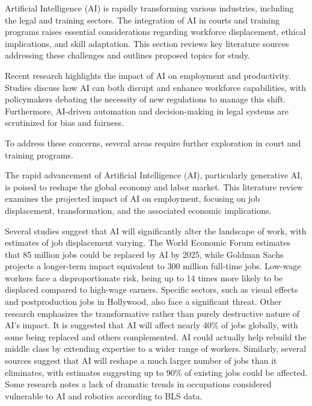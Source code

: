 \documentclass[a4paper,headinclude=on,footinclude=on,12pt,oneside]{scrbook}
\begin{document}
Artificial Intelligence (AI) is rapidly transforming various industries, including the legal and training sectors. The integration of AI in courts and training programs raises essential considerations regarding workforce displacement, ethical implications, and skill adaptation. This section reviews key literature sources addressing these challenges and outlines proposed topics for study.

Recent research highlights the impact of AI on employment and productivity. Studies discuss how AI can both disrupt and enhance workforce capabilities, with policymakers debating the necessity of new regulations to manage this shift. Furthermore, AI-driven automation and decision-making in legal systems are scrutinized for bias and fairness.

To address these concerns, several areas require further exploration in court and training programs.


The rapid advancement of Artificial Intelligence (AI), particularly generative AI, is poised to reshape the global economy and labor market. This literature review examines the projected impact of AI on employment, focusing on job displacement, transformation, and the associated economic implications.


Several studies suggest that AI will significantly alter the landscape of work, with estimates of job displacement varying. The World Economic Forum estimates that 85 million jobs could be replaced by AI by 2025, while Goldman Sachs projects a longer-term impact equivalent to 300 million full-time jobs. Low-wage workers face a disproportionate risk, being up to 14 times more likely to be displaced compared to high-wage earners. Specific sectors, such as visual effects and postproduction jobs in Hollywood, also face a significant threat. Other research emphasizes the transformative rather than purely destructive nature of AI’s impact. It is suggested that AI will affect nearly 40\% of jobs globally, with some being replaced and others complemented. AI could actually help rebuild the middle class by extending expertise to a wider range of workers. Similarly, several sources suggest that AI will reshape a much larger number of jobs than it eliminates, with estimates suggesting up to 90\% of existing jobs could be affected. Some research notes a lack of dramatic trends in occupations considered vulnerable to AI and robotics according to BLS data.
\end{document}
